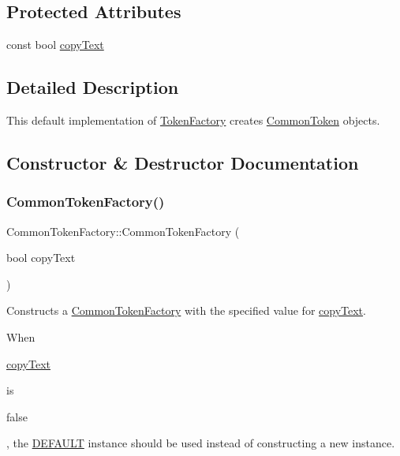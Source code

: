 \subsection*{Protected Attributes}
\begin{DoxyCompactItemize}
\item 
const bool \hyperlink{classantlr4_1_1CommonTokenFactory_a944c106da2cf4638ea989bcb20b482df}{copy\+Text}
\end{DoxyCompactItemize}


\subsection{Detailed Description}
This default implementation of \hyperlink{classantlr4_1_1TokenFactory}{Token\+Factory} creates \hyperlink{classantlr4_1_1CommonToken}{Common\+Token} objects. 

\subsection{Constructor \& Destructor Documentation}
\mbox{\label{classantlr4_1_1CommonTokenFactory_a580c068f46164c58052858432bbf974c}} 
\subsubsection{\texorpdfstring{Common\+Token\+Factory()}{CommonTokenFactory()}\hspace{0.1cm}{\footnotesize\ttfamily [1/2]}}
{\footnotesize\ttfamily Common\+Token\+Factory\+::\+Common\+Token\+Factory (\begin{DoxyParamCaption}\item[{bool}]{copy\+Text }\end{DoxyParamCaption})}

Constructs a \hyperlink{classantlr4_1_1CommonTokenFactory}{Common\+Token\+Factory} with the specified value for \hyperlink{classantlr4_1_1CommonTokenFactory_a944c106da2cf4638ea989bcb20b482df}{copy\+Text}.

When
\begin{DoxyCode}
\hyperlink{classantlr4_1_1CommonTokenFactory_a944c106da2cf4638ea989bcb20b482df}{copyText} 
\end{DoxyCode}
 is
\begin{DoxyCode}
\textcolor{keyword}{false} 
\end{DoxyCode}
 , the \hyperlink{classantlr4_1_1CommonTokenFactory_a141e9716e14a7b5c43a6d0bd3db82bcd}{D\+E\+F\+A\+U\+LT} instance should be used instead of constructing a new instance.



